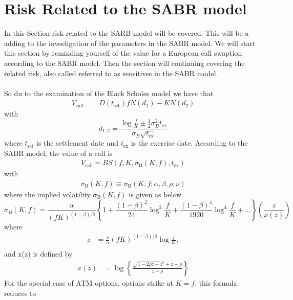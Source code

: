 \section{Risk Related to the SABR model} \label{risk_mang}
In this Section risk related to the SARB model will be covered. 
This will be a adding to the investigation of the parameters in the SABR model.
We will start this section by  reminding yourself of the value for
a European call swaption according to the SABR model. 
Then the section will continuing covering the related risk, also called referred to as sensitives in 
the SABR model. 
\\\\
So du to the examination of the Black Scholes model we have that \cite{Smile}
\begin{align}
    V_{\text{call}} &= D(t_{\text{set}})fN(d_1) - KN(d_2) \label{V_call} 
\end{align}
with
\begin{equation}
    d_{1,2} = \frac{\log \frac{f}{K} \pm \frac{1}{2}\sigma_B^2 t_{\text{ex}}}{\sigma_B \sqrt{t_{\text{ex}}}}
\end{equation}
where $t_{\text{set}}$ is the settlement date and $t_{\text{ex}}$ is the exercise date.
According to the SABR model, the value of a call is 
\begin{align}
    V_{\text{call}}= BS(f, K, \sigma_{\text{B}}(K,f),t_{\text{ex}})
\end{align}
with  
\begin{align}
    \sigma_{\text{B}}(K,f) \equiv \sigma_{\text{B}}(K,f;\alpha, \beta, \rho, \nu)
\end{align}
where the implied volatility $\sigma_{\text{B}}(K,f) $ is given as below
\begin{equation}
    \sigma_B(K, f) = \frac{\alpha}{(fK)^{(1-\beta)/2}} \left\{ 1 + \frac{(1-\beta)^2}{24} \log^2 \frac{f}{K} + \frac{(1-\beta)^4}{1920} \log^4 \frac{f}{K} + \ldots \right\} \left( \frac{z}{x(z)} \right)
    \label{eg_2}
\end{equation}
where
\begin{align}
    z &= \frac{\nu}{\alpha}(fK)^{(1-\beta)/2} \log \frac{f}{K}, \\
\end{align}
and x(z) is defined by
\begin{align}
    x(z) &= \log \left\{ \frac{\sqrt{1-2\rho z + z^2} + z - \rho}{1 - \rho} \right\}
\end{align}
For the special case of ATM options, options strike at $K = f$, this formula reduces to
